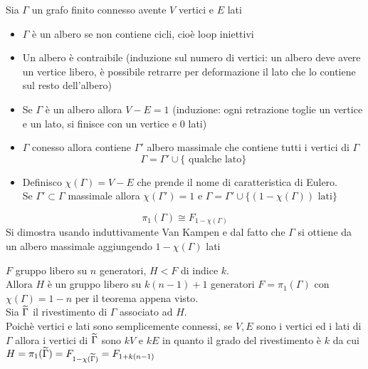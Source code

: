 \newpage


Sia $\Gamma$ un grafo finito connesso avente $V$ vertici e $E$ lati
\begin{itemize}
\item $\Gamma$ \`e un albero se non contiene cicli, cio\`e loop iniettivi
\item Un albero \`e contraibile (induzione sul numero di vertici: un albero deve avere un vertice libero, \`e possibile retrarre per deformazione  il lato che lo contiene sul resto dell'albero)
\item Se $\Gamma$ \`e un albero allora $V-E=1$ (induzione: ogni retrazione toglie un vertice e un lato, si finisce con un vertice e 0 lati)
\item $\Gamma $ conesso allora contiene $\Gamma'$ albero massimale che contiene tutti i vertici di $\Gamma$
$$ \Gamma = \Gamma' \cup \{ \text{ qualche lato} \}$$
\item Definisco $\chi(\Gamma)= V-E$ che prende il nome di caratteristica di Eulero.\\
Se $\Gamma'\subset\Gamma $ massimale allora $\chi(\Gamma')=1$ e $\Gamma=\Gamma'\cup \{ (1-\chi(\Gamma)) \text{ lati}\}$

\end{itemize}

\begin{thm}$$\pi_1(\Gamma)\cong F_{1-\chi(\Gamma)}$$
\proof Si dimostra usando induttivamente Van Kampen e dal fatto che $\Gamma$ si ottiene da un albero massimale aggiungendo $1-\chi (\Gamma)$ lati 
\end{thm}

\begin{thm}$F$ gruppo libero su $n$ generatori, $H < F$ di indice $k$.\\
Allora $H$ \`e un gruppo libero su $k(n-1)+1$ generatori
\proof $F=\pi_1(\Gamma)$ con $\chi(\Gamma)=1-n$ per il teorema appena visto.\\
Sia $\widetilde{\Gamma}$ il rivestimento di $\Gamma$ associato ad $H$.\\
Poich\`e vertici e lati sono semplicemente connessi, se $V,E$ sono i vertici ed i lati di $\Gamma$ allora i vertici di $\widetilde{\Gamma}$ sono $kV$ e $kE$ in quanto il grado del rivestimento \`e $k$ da cui 
$H=\pi_1(\widetilde{\Gamma})= F_{1-\chi(\widetilde{\Gamma})}=F_{1+k(n-1)}$
\endproof
\end{thm}





































